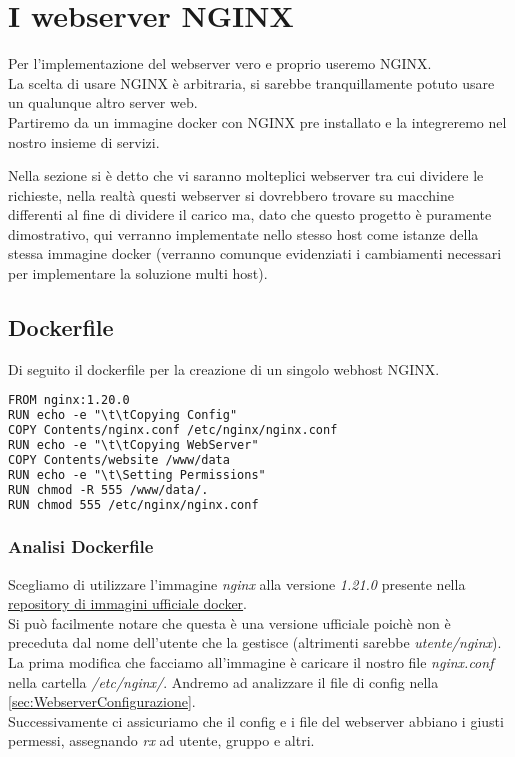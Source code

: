 \documentclass[../DocumentazioneProgetto.tex]{subfiles}
\begin{document}
	\section{I webserver NGINX}
	\label{sec:Webserver}
	Per l'implementazione del webserver vero e proprio useremo NGINX.\\
	La scelta di usare NGINX è arbitraria, si sarebbe tranquillamente potuto usare un qualunque altro server web.\\
	Partiremo da un immagine docker con NGINX pre installato e la integreremo nel nostro insieme di servizi.

	Nella sezione \textit{} si è detto che vi saranno molteplici webserver tra cui dividere le richieste,
	nella realtà questi webserver si dovrebbero trovare su macchine differenti al fine di dividere il carico ma, dato che questo progetto è puramente dimostrativo, qui verranno implementate nello stesso host come istanze della stessa immagine docker (verranno comunque evidenziati i cambiamenti necessari per implementare la soluzione multi host).
	\subsection{Dockerfile} 
	\label{sec:WebserverDockerfile}
	Di seguito il dockerfile per la creazione di un singolo webhost NGINX.
	\begin{lstlisting}[language=XML, caption=Dockerfile Webserver NGINX] 
FROM nginx:1.20.0
RUN echo -e "\t\tCopying Config"
COPY Contents/nginx.conf /etc/nginx/nginx.conf
RUN echo -e "\t\tCopying WebServer"
COPY Contents/website /www/data
RUN echo -e "\t\Setting Permissions"
RUN chmod -R 555 /www/data/.
RUN chmod 555 /etc/nginx/nginx.conf\end{lstlisting}
	\subsubsection{Analisi Dockerfile} 
	Scegliamo di utilizzare l'immagine \textit{nginx} alla versione \textit{1.21.0} presente nella \href{https://hub.docker.com/_/nginx}{repository di immagini ufficiale docker}.\\ 
	Si può facilmente notare che questa è una versione ufficiale poichè non	è preceduta dal nome dell'utente che la gestisce 
	(altrimenti sarebbe \textit{utente/nginx}).\\
	La prima modifica che facciamo all'immagine è caricare il nostro file \textit{nginx.conf} nella cartella \textit{/etc/nginx/}. Andremo ad analizzare il file di config nella \autoref{sec:WebserverConfigurazione}.\\
	Successivamente ci assicuriamo che il config e i file del webserver abbiano i giusti permessi, assegnando \textit{rx} ad utente, gruppo e altri. 
\end{document}
